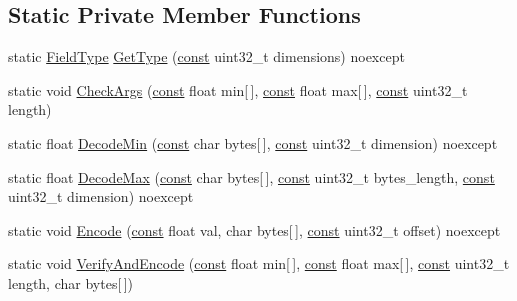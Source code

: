 \subsection*{Static Private Member Functions}
\begin{DoxyCompactItemize}
\item 
static \mbox{\hyperlink{classlucene_1_1core_1_1document_1_1FieldType}{Field\+Type}} \mbox{\hyperlink{classlucene_1_1core_1_1document_1_1FloatRange_ac04a6921c3fe17a684863f0b539c0cc9}{Get\+Type}} (\mbox{\hyperlink{ZlibCrc32_8h_a2c212835823e3c54a8ab6d95c652660e}{const}} uint32\+\_\+t dimensions) noexcept
\item 
static void \mbox{\hyperlink{classlucene_1_1core_1_1document_1_1FloatRange_a98e6d50006fd55567e23c446057a8b4a}{Check\+Args}} (\mbox{\hyperlink{ZlibCrc32_8h_a2c212835823e3c54a8ab6d95c652660e}{const}} float min\mbox{[}$\,$\mbox{]}, \mbox{\hyperlink{ZlibCrc32_8h_a2c212835823e3c54a8ab6d95c652660e}{const}} float max\mbox{[}$\,$\mbox{]}, \mbox{\hyperlink{ZlibCrc32_8h_a2c212835823e3c54a8ab6d95c652660e}{const}} uint32\+\_\+t length)
\item 
static float \mbox{\hyperlink{classlucene_1_1core_1_1document_1_1FloatRange_a8b52adb68b6c046ed19a775223ff06bf}{Decode\+Min}} (\mbox{\hyperlink{ZlibCrc32_8h_a2c212835823e3c54a8ab6d95c652660e}{const}} char bytes\mbox{[}$\,$\mbox{]}, \mbox{\hyperlink{ZlibCrc32_8h_a2c212835823e3c54a8ab6d95c652660e}{const}} uint32\+\_\+t dimension) noexcept
\item 
static float \mbox{\hyperlink{classlucene_1_1core_1_1document_1_1FloatRange_a0adcc9ba52f9818b12f34abdb7d9a47f}{Decode\+Max}} (\mbox{\hyperlink{ZlibCrc32_8h_a2c212835823e3c54a8ab6d95c652660e}{const}} char bytes\mbox{[}$\,$\mbox{]}, \mbox{\hyperlink{ZlibCrc32_8h_a2c212835823e3c54a8ab6d95c652660e}{const}} uint32\+\_\+t bytes\+\_\+length, \mbox{\hyperlink{ZlibCrc32_8h_a2c212835823e3c54a8ab6d95c652660e}{const}} uint32\+\_\+t dimension) noexcept
\item 
static void \mbox{\hyperlink{classlucene_1_1core_1_1document_1_1FloatRange_a7ae1d5511c0454db48cf70e7d872470e}{Encode}} (\mbox{\hyperlink{ZlibCrc32_8h_a2c212835823e3c54a8ab6d95c652660e}{const}} float val, char bytes\mbox{[}$\,$\mbox{]}, \mbox{\hyperlink{ZlibCrc32_8h_a2c212835823e3c54a8ab6d95c652660e}{const}} uint32\+\_\+t offset) noexcept
\item 
static void \mbox{\hyperlink{classlucene_1_1core_1_1document_1_1FloatRange_aa0179c3af6585d4e262298013d543093}{Verify\+And\+Encode}} (\mbox{\hyperlink{ZlibCrc32_8h_a2c212835823e3c54a8ab6d95c652660e}{const}} float min\mbox{[}$\,$\mbox{]}, \mbox{\hyperlink{ZlibCrc32_8h_a2c212835823e3c54a8ab6d95c652660e}{const}} float max\mbox{[}$\,$\mbox{]}, \mbox{\hyperlink{ZlibCrc32_8h_a2c212835823e3c54a8ab6d95c652660e}{const}} uint32\+\_\+t length, char bytes\mbox{[}$\,$\mbox{]})
\end{DoxyCompactItemize}
